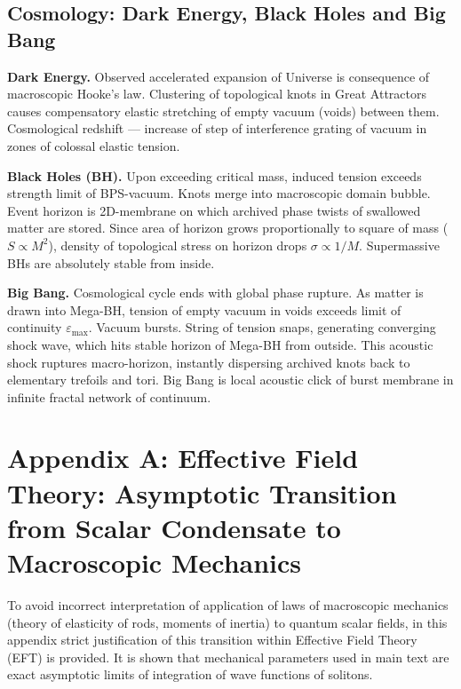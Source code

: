 \documentclass[12pt,a4paper]{article}
\begin{document}
\subsection{Cosmology: Dark Energy, Black Holes and Big Bang}
\textbf{Dark Energy.} Observed accelerated expansion of Universe is consequence of macroscopic Hooke's law. Clustering of topological knots in Great Attractors causes compensatory elastic stretching of empty vacuum (voids) between them. Cosmological redshift --- increase of step of interference grating of vacuum in zones of colossal elastic tension.

\textbf{Black Holes (BH).} Upon exceeding critical mass, induced tension exceeds strength limit of BPS-vacuum. Knots merge into macroscopic domain bubble. Event horizon is 2D-membrane on which archived phase twists of swallowed matter are stored. Since area of horizon grows proportionally to square of mass ($S \propto M^2$), density of topological stress on horizon drops $\sigma \propto 1/M$. Supermassive BHs are absolutely stable from inside.

\textbf{Big Bang.} Cosmological cycle ends with global phase rupture. As matter is drawn into Mega-BH, tension of empty vacuum in voids exceeds limit of continuity $\varepsilon_{\text{max}}$. Vacuum bursts. String of tension snaps, generating converging shock wave, which hits stable horizon of Mega-BH from outside. This acoustic shock ruptures macro-horizon, instantly dispersing archived knots back to elementary trefoils and tori. Big Bang is local acoustic click of burst membrane in infinite fractal network of continuum.

\appendix
\section{Appendix A: Effective Field Theory: Asymptotic Transition from Scalar Condensate to Macroscopic Mechanics}

To avoid incorrect interpretation of application of laws of macroscopic mechanics (theory of elasticity of rods, moments of inertia) to quantum scalar fields, in this appendix strict justification of this transition within Effective Field Theory (EFT) is provided. It is shown that mechanical parameters used in main text are exact asymptotic limits of integration of wave functions of solitons.
\end{document}
